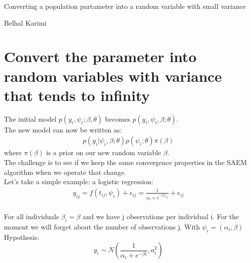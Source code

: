 \documentclass[a4paper]{article}
\begin{document}

\Large
 \begin{center}
Converting a population partameter into a random variable with small variance

\hspace{10pt}

\large
Belhal Karimi

\hspace{10pt}

\end{center}

\hspace{10pt}

\normalsize



\section{Convert the parameter into random variables with variance that tends to infinity}
The initial model $p(y_i, \psi_i;\beta,\theta)$ becomes $p(y_i, \psi_i,\beta;\theta)$.\\

The new model can now be written as:\\
\begin{align}
p(y_i| \psi_i,\beta;\theta)p(\psi_i;\theta)\pi(\beta)
\end{align}
where $\pi(\beta)$ is a prior on our new random variable $\beta$.\\
The challenge is to see if we keep the same convergence properties in the SAEM algorithm when we operate that change.\\

Let's take a simple example: a logistic regression:
\begin{align}
y_{ij} = f(t_{ij},\psi_i) + \epsilon_{ij}= \frac{1}{\alpha_i+e^{-\beta_i t_{ij}}} + \epsilon_{ij}
\end{align}\\
For all individuals $\beta_i = \beta$ and we have j observations per individual i. For the moment we will forget about the number of observations j.
With $\psi_i = (\alpha_i, \beta)$
Hypothesis:\\

\begin{equation}
 y_i \sim N(\frac{1}{\alpha_i+e^{-\beta t}},a_i^{2})
\end{equation}
\end{document}
